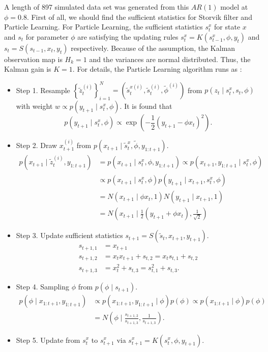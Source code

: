 A length of 897 simulated data set was generated from this $\mathit{AR}\left(1\right)$ model at $\phi=0.8$. First of all, we should find the sufficient statistics for Storvik filter and Particle Learning. For Particle Learning, the sufficient statistics $s_t^x$ for state $x$ and $s_t$ for parameter $\phi$ are satisfying the updating rules $s_t^x=K\left(s_{t-1}^x,\phi ,y_t\right)$ and $s_t=S\left(s_{t-1},x_t,y_t\right)$ respectively. Because of the assumption, the Kalman observation map is $H_k=1$ and the variances are normal distributed. Thus, the Kalman gain is $K=1$. For details, the Particle Learning algorithm runs as : 
\begin{itemize}\itemsep0em 
\item Step 1. Resample $\left\lbrace \tilde{z}_t^{\left(i\right)}\right\rbrace_{i=1}^N=\left(\tilde{s}_t^{x\left(i\right)},\tilde{s}_t^{\left(i\right)},\tilde{\phi }^{\left(i\right)}\right)$ from $p\left(z_t\mid s_t^x,s_t,\phi \right)$ with weight $w\propto p\left(y_{t+1}\mid s_{t}^x,\phi \right)$. It is found that \begin{equation*}
p\left(y_{t+1}\mid s_{t}^x,\phi \right) \propto \exp \left(-\frac{1}{2}\left(y_{t+1}-\phi  x_{t}\right)^2 \right).
\end{equation*}
\item Step 2. Draw $x_{t+1}^{\left(i\right)}$ from $p\left(x_{t+1}\mid \tilde{s}_t^x,\tilde{\phi },y_{1:t+1}\right)$. 
\begin{align*}
p\left(x_{t+1}\mid \tilde{z}_t^{\left(i\right)},y_{1:t+1}\right) &= p\left(x_{t+1}\mid s_t^x,\phi,y_{1:t+1}\right) \propto p\left(x_{t+1},y_{1:t+1}\mid s_t^x,\phi\right)\\
& \propto p\left(x_{t+1}\mid s_t^x,\phi\right)p\left(y_{t+1}\mid x_{t+1},s_t^x,\phi\right) \\
&= N\left(x_{t+1}\mid \phi x_t,1\right)N\left(y_{t+1}\mid x_{t+1},1\right)\\
&= N\left(x_{t+1}\mid \frac{1}{2}\left(y_{t+1}+\phi x_t\right),\frac{1}{\sqrt{2}}\right)
\end{align*}
\item Step 3. Update sufficient statistics  $s_{t+1}=S\left(\tilde{s}_{t}, x_{t+1},y_{t+1}\right)$.
\begin{align*}
s_{t+1,1} &= x_{t+1} \\
s_{t+1,2} &= x_tx_{t+1}+s_{t,2} = x_ts_{t,1}+s_{t,2} \\
s_{t+1,3} &= x_{t}^2 + s_{t,3} = s_{t,1}^2 + s_{t,3} .
\end{align*}
\item Step 4. Sampling $\phi $ from $p\left(\phi  \mid  s_{t+1}\right)$.
\begin{align*}
p\left(\phi  \mid  x_{1:t+1},y_{1:t+1}\right) & \propto p\left(x_{1:t+1},y_{1:t+1}\mid \phi \right)p\left(\phi \right)\propto p\left(x_{1:t+1}\mid \phi \right)p\left(\phi \right)\\
&= N\left( \phi \mid  \frac{s_{t+1,2}}{s_{t+1,3}},\frac{1}{s_{t+1,3}} \right).
\end{align*}
\item Step 5. Update from $s_{t}^x$ to $s_{t+1}^x$ via $s_{t+1}^x = K\left(s_{t}^x,\phi ,y_{t+1}\right)$.
\end{itemize}


